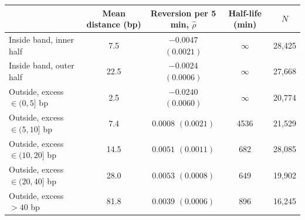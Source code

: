\begin{tabular}{lcccc}
\toprule
 & Mean distance (bp) & Reversion per 5 min, $\hat\rho$ & Half-life (min) & $N$ \\
\midrule
Inside band, inner half & 7.5 & $-0.0047$ $(0.0021)$ & $\infty$ & 28,425 \\
Inside band, outer half & 22.5 & $-0.0024$ $(0.0006)$ & $\infty$ & 27,668 \\
Outside, excess $\in(0,5]$ bp & 2.5 & $-0.0240$ $(0.0060)$ & $\infty$ & 20,774 \\
Outside, excess $\in(5,10]$ bp & 7.4 & $0.0008$ $(0.0021)$ & 4536 & 21,529 \\
Outside, excess $\in(10,20]$ bp & 14.5 & $0.0051$ $(0.0011)$ & 682 & 28,085 \\
Outside, excess $\in(20,40]$ bp & 28.0 & $0.0053$ $(0.0008)$ & 649 & 19,902 \\
Outside, excess $>40$ bp & 81.8 & $0.0039$ $(0.0006)$ & 896 & 16,245 \\
\bottomrule
\end{tabular}
